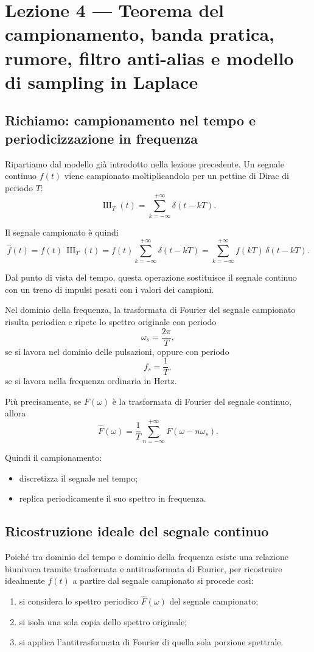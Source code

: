 \chapter{Lezione 4 --- Teorema del campionamento, banda pratica, rumore, filtro anti-alias e modello di sampling in Laplace}

\section{Richiamo: campionamento nel tempo e periodicizzazione in frequenza}

Ripartiamo dal modello già introdotto nella lezione precedente.
Un segnale continuo \(f(t)\) viene campionato moltiplicandolo per un pettine di Dirac
di periodo \(T\):
\[
\operatorname{III}_T(t)=\sum_{k=-\infty}^{+\infty}\delta(t-kT).
\]

Il segnale campionato è quindi
\[
\hat f(t)=f(t)\,\operatorname{III}_T(t)
=
f(t)\sum_{k=-\infty}^{+\infty}\delta(t-kT)
=
\sum_{k=-\infty}^{+\infty} f(kT)\,\delta(t-kT).
\]

Dal punto di vista del tempo, questa operazione sostituisce il segnale continuo
con un treno di impulsi pesati con i valori dei campioni.

Nel dominio della frequenza, la trasformata di Fourier del segnale campionato
risulta periodica e ripete lo spettro originale con periodo
\[
\omega_s=\frac{2\pi}{T},
\]
se si lavora nel dominio delle pulsazioni, oppure con periodo
\[
f_s=\frac{1}{T},
\]
se si lavora nella frequenza ordinaria in Hertz.

Più precisamente, se \(F(\omega)\) è la trasformata di Fourier del segnale continuo,
allora
\[
\hat F(\omega)=\frac{1}{T}\sum_{n=-\infty}^{+\infty} F(\omega-n\omega_s).
\]

Quindi il campionamento:
\begin{itemize}
    \item discretizza il segnale nel tempo;
    \item replica periodicamente il suo spettro in frequenza.
\end{itemize}

\section{Ricostruzione ideale del segnale continuo}

Poiché tra dominio del tempo e dominio della frequenza esiste una relazione biunivoca
tramite trasformata e antitrasformata di Fourier, per ricostruire idealmente \(f(t)\)
a partire dal segnale campionato si procede così:
\begin{enumerate}
    \item si considera lo spettro periodico \(\hat F(\omega)\) del segnale campionato;
    \item si isola una sola copia dello spettro originale;
    \item si applica l'antitrasformata di Fourier di quella sola porzione spettrale.
\end{enumerate}

